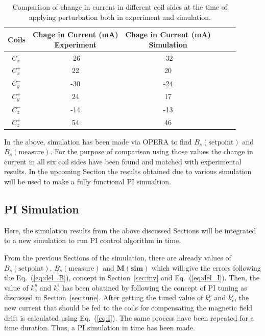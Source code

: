 \begin{table} [htb!]
    \centering
    \begin{tabular} { |c|c|c|c|c|c|} 
        \hline
        Coils & \makecell{Chage in Current (mA)\\Experiment} & \makecell{Chage in Current (mA)\\Simulation}\\
        \hline\hline
        $C_x^-$ & -26 & -32 \\ 
        \hline
        $C_x^+$ & 22 & 20 \\
        \hline
        $C_y^-$ & -30 & -24 \\
        \hline
        $C_y^+$ & 24 & 17 \\
        \hline
        $C_z^-$ & -14 & -13 \\
        \hline
        $C_z^+$ & 54 & 46 \\
        \hline

    \end{tabular}
    \caption{Comparison of change in current in different coil sides at the time of applying perturbation both in experiment and simulation.}\label{table:currentChange}
\end{table}

\FloatBarrier
In the above, simulation has been made via OPERA to find $B_s(\text{setpoint})$ and $B_s(\text{measure})$. For the purpose of comparison using those values the change in current in all six coil sides have been found and matched with experimental results. In the upcoming Section the results obtained due to various simulation will be used to make a fully functional PI simualtion.



\subsection{PI Simulation}
Here, the simulation results from the above discussed Sections will be integrated to a new simulation to run PI control algorithm in time.

From the previous Sections of the simulation, there are already values of $B_s(\text{setpoint})$, $B_s(\text{measure})$ and $\bm{M(\text{sim})}$ which will give the errors following the Eq.~(\ref{eq:del_B}), concept in Section~\ref{sec:inv} and Eq.~(\ref{eq:del_I}). Then, the value of $k_c^p$ and $k_c^i$ has been obatined by following the concept of PI tuning as discussed in Section~\ref{sec:tune}. After getting the tuned value of $k_c^p$ and $k_c^i$, the new current that should be fed to the coils for compensating the magnetic field drift is calculated using Eq.~(\ref{eq:I}). The same process have been repeated for a time duration. Thus, a PI simulation in time has been made. 

